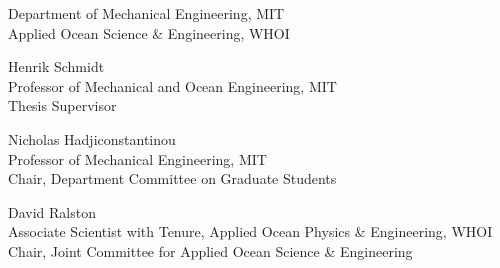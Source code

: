 \begin{titlepage}
\begin{center}
\begin{singlespace}
    \signature{Author}{\footnotesize Department of Mechanical Engineering, MIT \\ Applied Ocean Science \& Engineering, WHOI \\ \@date}
    \vspace{1em}
    \signature{Certified by}{Henrik Schmidt \\ \footnotesize Professor of Mechanical and Ocean Engineering, MIT \\ Thesis Supervisor}
    \vspace{1em}
    \signature{Accepted by}{Nicholas Hadjiconstantinou \\ \footnotesize Professor of Mechanical Engineering, MIT \\ Chair, Department Committee on Graduate Students}
    \vspace{1em}
    \signature{Accepted by}{David Ralston \\ \footnotesize Associate Scientist with Tenure, Applied Ocean Physics \& Engineering, WHOI \\ Chair, Joint Committee for Applied Ocean Science \& Engineering}
    \end{singlespace}
  \end{center}
  \makeatother
\end{titlepage}

\newpage
\null
\thispagestyle{empty}
\newpage
